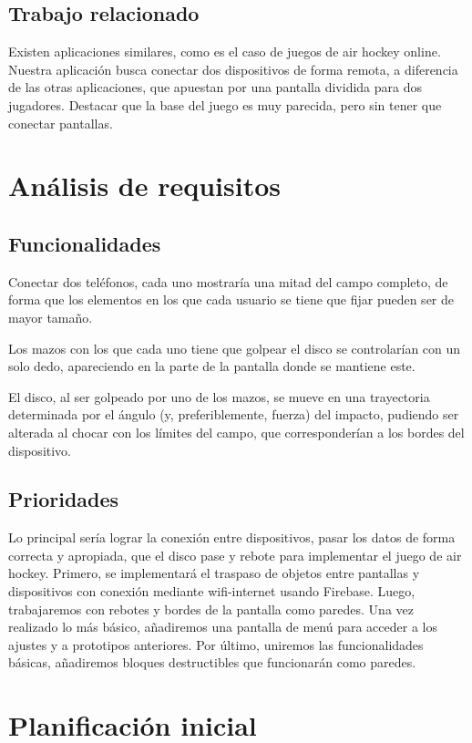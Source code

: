 \documentclass[a4paper,openright,12pt]{article}
\begin{document}
\subsection{Trabajo relacionado}
Existen aplicaciones similares, como es el caso de juegos de air hockey online. Nuestra aplicación busca conectar dos dispositivos de forma remota, a diferencia de las otras aplicaciones, que apuestan por una pantalla dividida para dos jugadores. Destacar que la base del juego es muy parecida, pero sin tener que conectar pantallas.

\section{Análisis de requisitos}

\subsection{Funcionalidades}
Conectar dos teléfonos, cada uno mostraría una mitad del campo completo, de forma que los elementos en los que cada usuario se tiene que fijar pueden ser de mayor tamaño.
 
Los mazos con los que cada uno tiene que golpear el disco se controlarían con un solo dedo, apareciendo en la parte de la pantalla donde se mantiene este.
 
El disco, al ser golpeado por uno de los mazos, se mueve en una trayectoria determinada por el ángulo (y, preferiblemente, fuerza) del impacto, pudiendo ser alterada al chocar con los límites del campo, que corresponderían a los bordes del dispositivo.
\subsection{Prioridades}
Lo principal sería lograr la conexión entre dispositivos, pasar los datos de forma correcta y apropiada, que el disco pase y rebote para implementar el juego de air hockey.
Primero, se implementará el traspaso de objetos entre pantallas y dispositivos con conexión mediante wifi-internet usando Firebase.
Luego, trabajaremos con rebotes y bordes de la pantalla como paredes.
Una vez realizado lo más básico, añadiremos una pantalla de menú para acceder a los ajustes y a prototipos anteriores. 
Por último, uniremos las funcionalidades básicas, añadiremos bloques destructibles que funcionarán como paredes.

\section{Planificación inicial}
\end{document}
